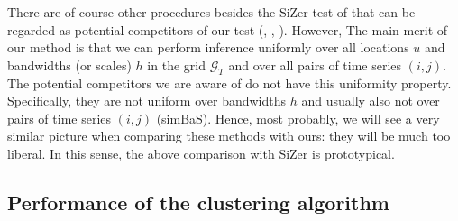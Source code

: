 \documentclass[12pt]{article}
\begin{document}
There are of course other procedures besides the SiZer test of \cite{Park2009} that can be regarded as potential competitors of our test (\cite{DegrasWu2012}, \cite{Meyer2015}, \cite{Lyubchich2016}). However,  The main merit of our method is that we can perform inference uniformly over all locations $u$ and bandwidths (or scales) $h$ in the grid $\mathcal{G}_T$ and over all pairs of time series $(i,j)$. The potential competitors we are aware of do not have this uniformity property. Specifically, they are not uniform over bandwidths $h$ and usually also not over pairs of time series $(i,j)$ (simBaS). Hence, most probably, we will see a very similar picture when comparing these methods with ours: they will be much too liberal. In this sense, the above comparison with SiZer is prototypical. 


\subsection{Performance of the clustering algorithm}\label{subsec:sim:clustering}
\end{document}
